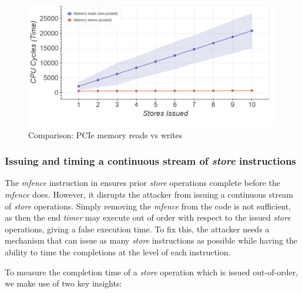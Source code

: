 \begin{figure}[!htb]
    \centering
    \includegraphics[width=0.8\columnwidth]{figures/interconnect-sc/store-ops/pcie_mem_reads_v_writes.png}
    \caption{Comparison: PCIe memory reads vs writes}
    \label{fig:pcie-mem-reads-v-writes}
\end{figure}

\begin{minipage}{\textwidth}
    
    \captionsetup{type=lstlisting}
    \caption{Profiling the execution time of \textit{load/store} instruction.
    Each \textit{load} or \textit{store} instruction is issued on a unique memory address which is more than 64 bytes from the previous address.}
    \label{lst:pcie-mem-reads-v-writes}
\end{minipage}

\subsubsection{Issuing and timing a continuous stream of \textit{store} instructions}
\label{subsubsec:interconnect-sc-store-ops-challenges-measuring-time}

The \textit{mfence} instruction in  ensures prior \textit{store} operations complete before the \textit{mfence} does.
However, it disrupts the attacker from issuing a continuous stream of \textit{store} operations.
Simply removing the \textit{mfence} from the code is not sufficient, as then the end \textit{timer} may execute out of order with respect to the issued \textit{store} operations, giving a false execution time.
To fix this, the attacker needs a mechanism that can issue as many \textit{store} instructions as possible while having the ability to time the completions at the level of each instruction.

To measure the completion time of a \textit{store} operation which is issued out-of-order, we make use of two key insights:

